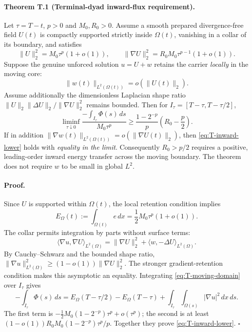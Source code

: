 \paragraph{Theorem T.1 (Terminal-dyad inward-flux requirement).}
Let $\tau=T-t$, $p>0$ and $M_0,R_0>0$.
Assume a smooth prepared divergence-free field $U(t)$ is compactly
supported strictly inside $\Omega(t)$, vanishing in a collar of its
boundary, and satisfies
\begin{equation}\label{eq:T-U-scaling}
 \|U\|_2^2=M_0\tau^p(1+o(1)),\qquad
 \|\nabla U\|_2^2=R_0M_0\tau^{p-1}(1+o(1)).
\end{equation}
Suppose the genuine unforced solution $u=U+w$ retains the carrier
\emph{locally} in the moving core:
\begin{equation}\label{eq:T-local-L2}
 \|w(t)\|_{L^2(\Omega(t))}=o(\|U(t)\|_2).
\end{equation}
Assume additionally the dimensionless Laplacian shape ratio
$\|U\|_2\|\Delta U\|_2/\|\nabla U\|_2^2$ remains bounded.
Then for $I_\tau=[T-\tau,T-\tau/2]$,
\begin{equation}\label{eq:T-inward-lower}
 \boxed{\liminf_{\tau\downarrow0}
 \frac{-\int_{I_\tau}\Phi(s)\,ds}{M_0\tau^p}
 \ge \frac{1-2^{-p}}{p}\left(R_0-\frac p2\right).}
\end{equation}
If in addition
$\|\nabla w(t)\|_{L^2(\Omega(t))}
=o(\|\nabla U(t)\|_2)$,
then \eqref{eq:T-inward-lower} holds with
\emph{equality in the limit}.
Consequently $R_0>p/2$ requires a positive, leading-order
inward energy transfer across the moving boundary.
The theorem does not require $w$ to be small in global $L^2$.

\paragraph{Proof.}
Since $U$ is supported within $\Omega(t)$, the local retention
condition implies
\[
 E_\Omega(t):=\int_{\Omega(t)}e\,dx
 =\frac12 M_0\tau^p(1+o(1)).
\]
The collar permits integration by parts without surface terms:
\[
 \langle\nabla u,\nabla U\rangle_{L^2(\Omega)}
 =\|\nabla U\|_2^2+\langle w,-\Delta U\rangle_{L^2(\Omega)}.
\]
By Cauchy--Schwarz and the bounded shape ratio,
$\|\nabla u\|_{L^2(\Omega)}^2
\ge(1-o(1))\|\nabla U\|_2^2$.
The stronger gradient-retention condition makes this
asymptotic an equality.
Integrating \eqref{eq:T-moving-domain} over $I_\tau$ gives
\[
 -\int_{I_\tau}\Phi(s)\,ds
 =E_\Omega(T-\tau/2)-E_\Omega(T-\tau)
 +\int_{I_\tau}\!\int_{\Omega(s)}
 |\nabla u|^2\,dx\,ds.
\]
The first term is
$-\frac12M_0(1-2^{-p})\tau^p+o(\tau^p)$;
the second is at least
$(1-o(1))R_0M_0(1-2^{-p})\tau^p/p$.
Together they prove \eqref{eq:T-inward-lower}.
\hfill$\square$

